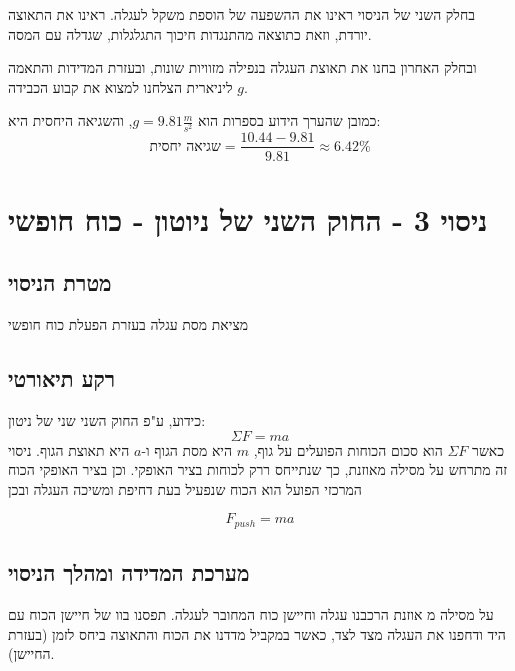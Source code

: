 \documentclass[14pt]{extarticle}
\begin{document}
בחלק השני של הניסוי ראינו את ההשפעה של הוספת משקל לעגלה. ראינו את התאוצה יורדת, וזאת כתוצאה מהתנגדות חיכוך התגלגלות, שגדלה עם המסה.

ובחלק האחרון בחנו את תאוצת העגלה בנפילה מזוויות שונות, ובעזרת המדידות והתאמה ליניארית הצלחנו למצוא את קבוע הכבידה $g$.

כמובן שהערך הידוע בספרות הוא $g = 9.81 \frac{m}{s^2}$, והשגיאה היחסית היא:
\begin{equation}
\text{שגיאה יחסית} = \frac{10.44 - 9.81}{9.81} \approx 6.42\%
\end{equation}

\section*{ניסוי 3 - החוק השני של ניוטון - כוח  חופשי}
\subsection*{מטרת הניסוי}
מציאת מסת עגלה בעזרת הפעלת כוח חופשי
\subsection*{רקע תיאורטי}   
כידוע, ע"פ החוק השני שני של ניטון:
\begin{equation}
\Sigma F = m a
\end{equation}
כאשר $\Sigma F$ הוא סכום הכוחות הפועלים על גוף, $m$ היא מסת הגוף ו-$a$ היא תאוצת הגוף.
ניסוי זה מתרחש על מסילה מאוזנת, כך שנתייחס ררק לכוחות בציר האופקי.
וכן בציר האופקי הכוח המרכזי הפועל הוא הכוח שנפעיל בעת דחיפת ומשיכה העגלה ובכן

\begin{equation}
F_{push} = m a
\end{equation}
\subsection*{מערכת המדידה ומהלך הניסוי}
על  מסילה מ אוזנת הרכבנו עגלה וחיישן כוח המחובר לעגלה.
תפסנו בוו של  חיישן הכוח עם היד ודחפנו את העגלה מצד לצד, כאשר במקביל מדדנו  את הכוח והתאוצה  ביחס לזמן (בעזרת החיישן).
\end{document}
